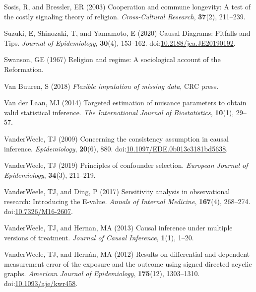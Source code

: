 \documentclass[
  single column]{article}
\newlength{\cslhangindent}
\newenvironment{CSLReferences}[2] %
 {\begin{list}{}{%
  \setlength{\itemindent}{0pt}
  \setlength{\leftmargin}{0pt}
  \setlength{\parsep}{0pt}
  \ifodd #1
   \setlength{\leftmargin}{\cslhangindent}
   \setlength{\itemindent}{-1\cslhangindent}
  \fi
  \setlength{\itemsep}{#2\baselineskip}}}
 {\end{list}}
\begin{document}
\begin{CSLReferences}{1}{0}
Sosis, R, and Bressler, ER (2003) Cooperation and commune longevity: A
test of the costly signaling theory of religion. \emph{Cross-Cultural
Research}, \textbf{37}(2), 211--239.

Suzuki, E, Shinozaki, T, and Yamamoto, E (2020) Causal Diagrams:
Pitfalls and Tips. \emph{Journal of Epidemiology}, \textbf{30}(4),
153--162.
doi:\href{https://doi.org/10.2188/jea.JE20190192}{10.2188/jea.JE20190192}.

Swanson, GE (1967) Religion and regime: A sociological account of the
{R}eformation.

Van Buuren, S (2018) \emph{Flexible imputation of missing data}, CRC
press.

Van der Laan, MJ (2014) Targeted estimation of nuisance parameters to
obtain valid statistical inference. \emph{The International Journal of
Biostatistics}, \textbf{10}(1), 29--57.

VanderWeele, TJ (2009) Concerning the consistency assumption in causal
inference. \emph{Epidemiology}, \textbf{20}(6), 880.
doi:\href{https://doi.org/10.1097/EDE.0b013e3181bd5638}{10.1097/EDE.0b013e3181bd5638}.

VanderWeele, TJ (2019) Principles of confounder selection.
\emph{European Journal of Epidemiology}, \textbf{34}(3), 211--219.

VanderWeele, TJ, and Ding, P (2017) Sensitivity analysis in
observational research: Introducing the {E}-value. \emph{Annals of
Internal Medicine}, \textbf{167}(4), 268--274.
doi:\href{https://doi.org/10.7326/M16-2607}{10.7326/M16-2607}.

VanderWeele, TJ, and Hernan, MA (2013) Causal inference under multiple
versions of treatment. \emph{Journal of Causal Inference},
\textbf{1}(1), 1--20.

VanderWeele, TJ, and Hernán, MA (2012) Results on differential and
dependent measurement error of the exposure and the outcome using signed
directed acyclic graphs. \emph{American Journal of Epidemiology},
\textbf{175}(12), 1303--1310.
doi:\href{https://doi.org/10.1093/aje/kwr458}{10.1093/aje/kwr458}.


\end{CSLReferences}
\end{document}

